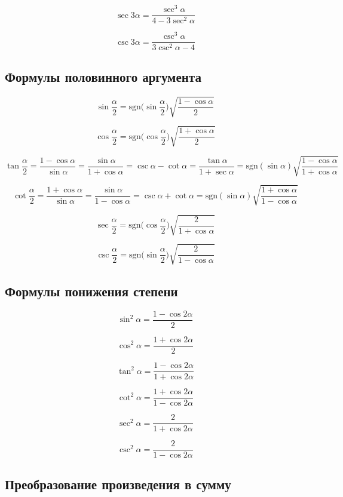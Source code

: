 \documentclass[
  letterpaper,
]{scrbook}
\newcommand{\sgn}{\mathrm{sgn}}
\theoremstyle{definition}
\theoremstyle{remark}
\begin{document}
\[
\sec 3\alpha = \frac{\sec^3 \alpha}{4 - 3\sec^2 \alpha}
\]

\[
\csc 3\alpha = \frac{\csc^3 \alpha}{3\csc^2 \alpha -4}
\]

\subsection{Формулы половинного аргумента}\label{trig_half_arg}

\[
\sin \frac{\alpha}{2} = \sgn \Big(\sin \frac{\alpha}{2} \Big) \sqrt{\frac{1 - \cos \alpha}{2}}
\]

\[
\cos \frac{\alpha}{2} = \sgn \Big( \cos \frac{\alpha}{2} \Big) \sqrt{\frac{1 + \cos \alpha}{2}}
\]

\[
\tan \frac{\alpha}{2} = \frac{1 - \cos\alpha}{\sin \alpha} = \frac{\sin \alpha}{1 + \cos \alpha} = \csc \alpha - \cot \alpha = \frac{\tan \alpha}{1 + \sec \alpha} = \sgn (\sin \alpha) \sqrt{\frac{1 - \cos \alpha}{1 + \cos \alpha}}
\]

\[
\cot \frac{\alpha}{2} = \frac{1 + \cos \alpha}{\sin \alpha} = \frac{\sin \alpha}{1 - \cos \alpha} = \csc \alpha + \cot \alpha = \sgn(\sin \alpha) \sqrt{\frac{1 + \cos \alpha}{1 - \cos{\alpha}}}
\]

\[
\sec \frac{\alpha}{2} = \sgn \Big( \cos \frac{\alpha}{2} \Big) \sqrt{\frac{2}{1 + \cos \alpha}}
\]

\[
\csc \frac{\alpha}{2} = \sgn \Big( \sin \frac{\alpha}{2}  \Big) \sqrt{\frac{2}{1 - \cos \alpha}}
\]

\subsection{Формулы понижения степени}\label{trig_power_reduction}

\[
\sin^2 \alpha = \frac{1 - \cos 2\alpha}{2}
\]

\[
\cos^2 \alpha = \frac{1 + \cos 2\alpha}{2}
\]

\[
\tan^2 \alpha = \frac{1 - \cos 2\alpha}{1 + \cos 2\alpha}
\]

\[
\cot^2 \alpha = \frac{1 + \cos 2\alpha}{1 - \cos 2\alpha}
\]

\[
\sec^2 \alpha = \frac{2}{1 + \cos 2\alpha}
\]

\[
\csc^2 \alpha = \frac{2}{1 - \cos 2\alpha}
\]

\subsection{Преобразование произведения в сумму}\label{trig_prod_to_sum}
\end{document}
